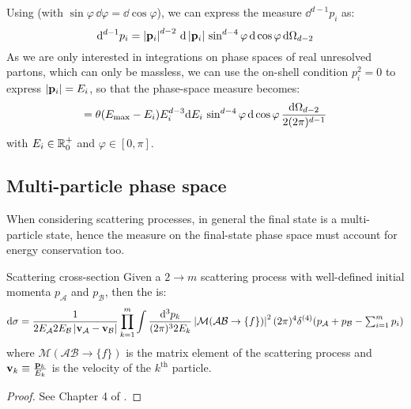 Using  (with $ \sin \varphi \, \dd \varphi = \dd \cos \varphi $), we can express the measure $ \dd^{d-1} p_i $ as:
\begin{equation}
  \mathrm{d}^{d-1} p_i = \left\lvert\mathbf{p}_i\right\rvert^{d-2} \, \mathrm{d} \left\lvert\mathbf{p}_i\right\rvert \, \sin^{d-4} \varphi \, \mathrm{d} \cos \varphi \, \mathrm{d} \Omega_{d-2}
\end{equation}
As we are only interested in integrations on phase spaces of real unresolved partons, which can only be massless, we can use the on-shell condition $ p_i^2 = 0 $ to express $ \left\lvert\mathbf{p}_i\right\rvert = E_i $, so that the phase-space measure becomes:
\begin{equation}
  [\dd p_i] = \theta(\ema - E_i) E_i^{d-3} \dd E_i \, \sin^{d-4} \varphi \, \dd \cos \varphi \, \frac{\dd \Omega_{d-2}}{2(2\pi)^{d-1}}
\end{equation}
with $ E_i \in \mathbb{R}^+_0 $ and $ \varphi \in [0,\pi] $.

\subsection{Multi-particle phase space}
\label{ssec:multi-part-ps}

When considering scattering processes, in general the final state is a multi-particle state, hence the measure on the final-state phase space must account for energy conservation too.

\begin{theorem}{Scattering cross-section}{}
  Given a $ 2 \rightarrow m $ scattering process with well-defined initial momenta $ p_\mathcal{A} $ and $ p_\mathcal{B} $, then the  is:
  \begin{equation}
    \mathrm{d}\sigma = \frac{1}{2E_\mathcal{A} 2E_\mathcal{B} \left\lvert\mathbf{v}_\mathcal{A} - \mathbf{v}_\mathcal{B}\right\rvert} \prod_{k = 1}^m \int \frac{\mathrm{d}^3p_k}{(2\pi)^3 2E_k} \left\lvert\mathcal{M}(\mathcal{A} \mathcal{B} \rightarrow \{f\})\right\rvert^2 (2\pi)^4 \delta^{(4)}(p_\mathcal{A} + p_\mathcal{B} - \textstyle\sum_{i = 1}^m p_i)
    \label{eq:scatt-cr-sec}
  \end{equation}
  where $ \mathcal{M}(\mathcal{A} \mathcal{B} \rightarrow \{f\}) $ is the matrix element of the scattering process and $ \mathbf{v}_k \equiv \frac{\mathbf{p}_k}{E_k} $ is the velocity of the $ k^\text{th} $ particle.
\end{theorem}

\begin{proofbox}
  \begin{proof}
    See Chapter 4 of \cite{Peskin-1995}.
  \end{proof}
\end{proofbox}

